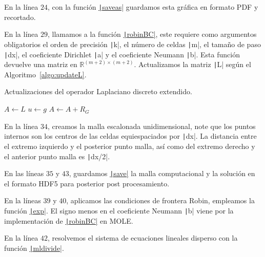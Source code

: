 \begin{problem}
En la línea $24$, con la función
\href{https://docs.octave.org/latest/Printing-and-Saving-Plots.html}{\texttt|saveas|}
guardamos esta gráfica en formato PDF y recortado.

En la línea $29$, llamamos a la función
\href{https://carlosal1015.github.io/mole_examples/api_docs/matlab/src/matlab/robinBC.html}{\texttt|robinBC|},
este requiere como argumentos obligatorios el orden de precisión
\texttt|k|, el número  de celdas \texttt|m|,
el tamaño de paso \texttt|dx|, el coeficiente Dirichlet
\texttt|a| y el coeficiente Neumann \texttt|b|.
Esta función devuelve una matriz en
\begin{math}
    \mathbb{R}^{\left(m+2\right)\times\left(m+2\right)}
\end{math}.
Actualizamos la matriz \texttt|L| según el Algoritmo~\ref{algo:updateL}.

\begin{algorithm}[H]
    \caption{Actualizaciones del operador Laplaciano discreto extendido.}\label{algo:updateL}
    $A\leftarrow L$\;
    $u\leftarrow g$\;
    $A\leftarrow A+R_{G}$\;
\end{algorithm}

En la línea $34$, creamos la malla escalonada unidimensional, note
que los puntos internos son los centros de las celdas equiespaciados
por \texttt|dx|.
La distancia entre el extremo izquierdo y el posterior punto malla,
así como del extremo derecho y el anterior punto malla es
\texttt|dx/2|.

En las líneas $35$ y $43$, guardamos
\href{https://docs.octave.org/latest/Simple-File-I_002fO.html#index-save-6}{\texttt|save|}
la malla computacional y la solución en el formato HDF5 para
posterior post procesamiento.

En la líneas $39$ y $40$, aplicamos las condiciones de frontera
Robin, empleamos la función \href{https://docs.octave.org/latest/Exponents-and-Logarithms.html#XREFexp}{\texttt|exp|}.
El signo menos en el coeficiente Neumann \texttt|b| viene
por la implementación de \href{https://carlosal1015.github.io/mole_examples/api_docs/matlab/src/matlab/robinBC.html}{\texttt|robinBC|}
en MOLE.

En la línea $42$, resolvemos el sistema de ecuaciones lineales
disperso con la función \href{https://docs.octave.org/latest/Arithmetic-Ops.html#index-mldivide}{\texttt|mldivide|}.


\end{problem}
